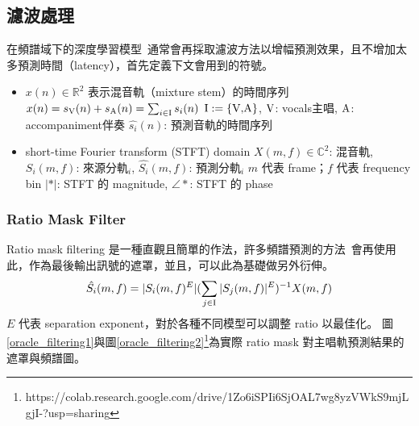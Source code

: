 \subsection{濾波處理}
在頻譜域下的深度學習模型~\cite{hennequin2020spleeter,stoter20182018}通常會再採取濾波方法以增幅預測效果，且不增加太多預測時間（latency），首先定義下文會用到的符號。
\begin{itemize}
    \item $x(n)\in\mathbb{R}^2$ 表示混音軌（mixture stem）的時間序列
    \subitem $x(n)=s_{\textup{V}}{(n)} + s_{\textup{A}}{(n)} = \sum_{i\in\textup{I}}{s_i{(n)}}$
    \subitem $\textup{I} := \{\textup{V,A}\}$, $\textup{V}$: vocals主唱, $\textup{A}$: accompaniment伴奏
    \subitem $\hat{s_i}{(n)}$: 預測音軌的時間序列
    \item short-time Fourier transform (STFT) domain
    \subitem $X(m,f)\in\mathbb{C}^2$: 混音軌, $S_i(m,f)$: 來源分軌$_i$, $\hat{S_i}{(m,f)}$: 預測分軌$_i$
    \subitem $m$ 代表 frame；$f$ 代表 frequency bin
    \subitem $\vert\ast\vert$: STFT 的 magnitude, $\angle \ast$: STFT 的 phase
\end{itemize}

\subsubsection{Ratio Mask Filter}
Ratio mask filtering 是一種直觀且簡單的作法，許多頻譜預測的方法~\cite{bao_abdulla_2018,stoter20182018}會再使用此，作為最後輸出訊號的遮罩，並且，可以此為基礎做另外衍伸。
\begin{equation*}
    \hat{S_i}{(m,f)} = \vert S_i(m,f)^E\vert (\sum_{j\in\textup{I}}\vert S_j(m,f)\vert^E)^{-1}X(m,f)
\end{equation*}
$E$ 代表 separation exponent，對於各種不同模型可以調整 ratio 以最佳化。
圖\ref{oracle_filtering1}與圖\ref{oracle_filtering2}\footnote{https://colab.research.google.com/drive/1Zo6iSPIi6SjOAL7wg8yzVWkS9mjLgjI-?usp=sharing}為實際 ratio mask 對主唱軌預測結果的遮罩與頻譜圖。

